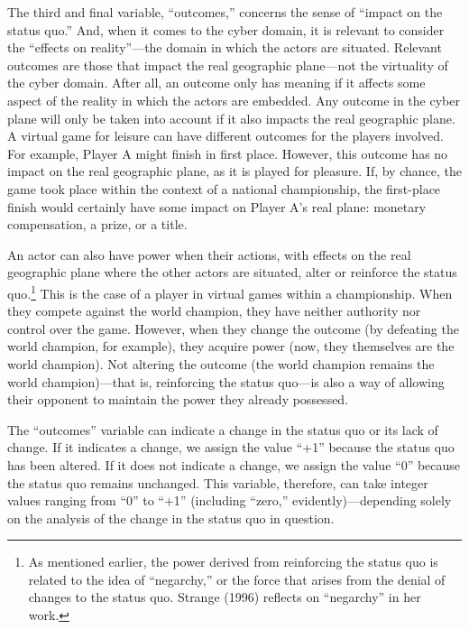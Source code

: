 The third and final variable, ``outcomes,'' concerns the sense of ``impact on the status quo.'' And, when it comes to the cyber domain, it is relevant to consider the ``effects on reality''---the domain in which the actors are situated. Relevant outcomes are those that impact the real geographic plane---not the virtuality of the cyber domain. After all, an outcome only has meaning if it affects some aspect of the reality in which the actors are embedded. Any outcome in the cyber plane will only be taken into account if it also impacts the real geographic plane. A virtual game for leisure can have different outcomes for the players involved. For example, Player A might finish in first place. However, this outcome has no impact on the real geographic plane, as it is played for pleasure. If, by chance, the game took place within the context of a national championship, the first-place finish would certainly have some impact on Player A's real plane: monetary compensation, a prize, or a title.

An actor can also have power when their actions, with effects on the real geographic plane where the other actors are situated, alter or reinforce the status quo.\footnote{As mentioned earlier, the power derived from reinforcing the status quo is related to the idea of ``negarchy,'' or the force that arises from the denial of changes to the status quo. Strange (1996) reflects on ``negarchy'' in her work.} This is the case of a player in virtual games within a championship. When they compete against the world champion, they have neither authority nor control over the game. However, when they change the outcome (by defeating the world champion, for example), they acquire power (now, they themselves are the world champion). Not altering the outcome (the world champion remains the world champion)---that is, reinforcing the status quo---is also a way of allowing their opponent to maintain the power they already possessed.

The ``outcomes'' variable can indicate a change in the status quo or its lack of change. If it indicates a change, we assign the value ``+1'' because the status quo has been altered. If it does not indicate a change, we assign the value ``0'' because the status quo remains unchanged. This variable, therefore, can take integer values ranging from ``0'' to ``+1'' (including ``zero,'' evidently)---depending solely on the analysis of the change in the status quo in question.


